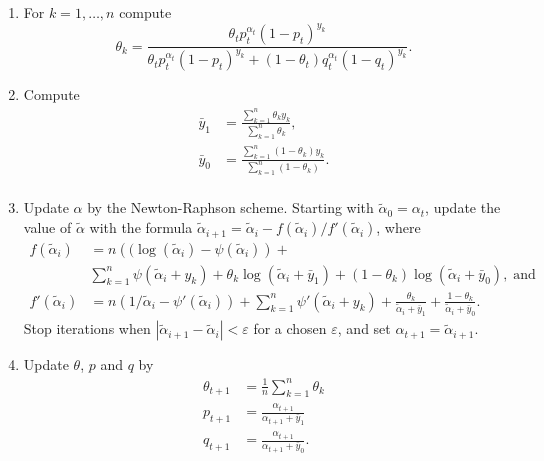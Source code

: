 \documentclass[12pt]{article}
\begin{document}
\begin{appendices}
\begin{enumerate}
      \item For $k = 1, \ldots , n$ compute
        \begin{equation*}
        \theta_k = \frac{\theta_t p_t^{\alpha_t}(1-p_t)^{y_k}}
        {\theta_t p_t^{\alpha_t}(1-p_t)^{y_k} + (1-\theta_t)
         q_t^{\alpha_t}(1-q_t)^{y_k}}.
        \end{equation*}

      \item Compute
        \begin{align*}
        \bar{y}_1 &= \frac{\sum_{k=1}^n \theta_k y_k}
          {\sum_{k=1}^n \theta_k}, \\
        \bar{y}_0 &= \frac{\sum_{k=1}^n (1-\theta_k) y_k}
          {\sum_{k=1}^n (1-\theta_k)}. \\
        \end{align*}

      \item Update $\alpha$ by the Newton-Raphson scheme. Starting
        with $\tilde{\alpha}_{0} = \alpha_t$,
        update the value of $\tilde{\alpha}$
        with the formula
        $\tilde{\alpha}_{i+1} = \tilde{\alpha}_i -
        f(\tilde{\alpha}_i)/f'(\tilde{\alpha}_i)$, where
        \begin{align*}
          f(\tilde{\alpha}_i) &= n \left( (\log(\tilde{\alpha}_i) -
          \psi(\tilde{\alpha}_i) \right) + \\
          &\sum_{k=1}^n \psi(\tilde{\alpha}_i+y_k) +
          \theta_k \log(\tilde{\alpha}_i + \bar{y}_1)
          + (1-\theta_k) \log(\tilde{\alpha}_i + \bar{y}_0),
          \; \text{and} \\
          f'(\tilde{\alpha}_i) &= n \left( 1/\tilde{\alpha}_i -
          \psi'(\tilde{\alpha}_i) \right) +
          \sum_{k=1}^n \psi'(\tilde{\alpha}_i+y_k) +
          \frac{\theta_k}{\tilde{\alpha}_i+\bar{y}_1} +
          \frac{1-\theta_k}{\tilde{\alpha}_i + \bar{y}_0}.
        \end{align*}
        Stop iterations when
        $|\tilde{\alpha}_{i+1} - \tilde{\alpha}_i| < \varepsilon$ for
        a chosen $\varepsilon$, and set $\alpha_{t+1} =
        \tilde{\alpha}_{i+1}$.

      \item Update $\theta$, $p$ and $q$ by
        \begin{align*}
        \theta_{t+1} &= \frac{1}{n}\sum_{k=1}^n\theta_k \\
        p_{t+1} &= \frac{\alpha_{t+1}} {\alpha_{t+1}+\bar{y}_1} \\
        q_{t+1} &= \frac{\alpha_{t+1}} {\alpha_{t+1}+\bar{y}_0}.
        \end{align*}


\end{enumerate}
\end{appendices}
\end{document}
